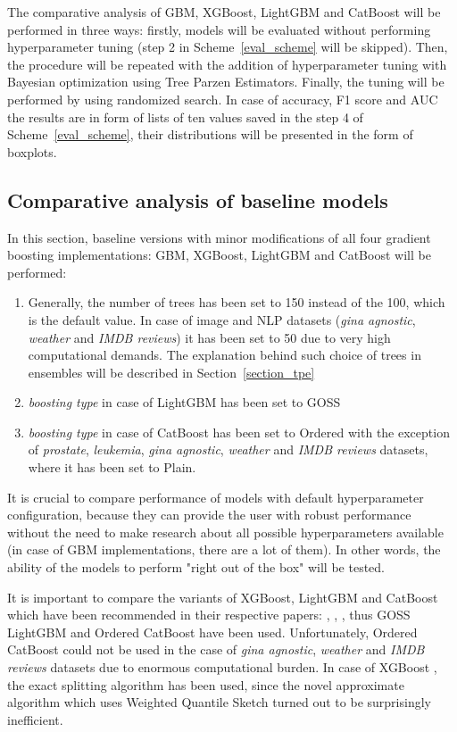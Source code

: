 \documentclass[magisterska, english]{pwr_wmat_praca_dyplomowa}
\theoremstyle{plain}
\numberwithin{theorem}{chapter}
\theoremstyle{definition}
\numberwithin{theorem}{chapter}
\begin{document}
The comparative analysis of GBM, XGBoost, LightGBM and CatBoost will be performed in three ways: firstly, models will be evaluated without performing hyperparameter tuning (step 2 in Scheme~\ref{eval_scheme} will be skipped). Then, the procedure will be repeated with the addition of hyperparameter tuning with Bayesian optimization using Tree Parzen Estimators. Finally, the tuning will be performed by using randomized search. In case of accuracy, F1 score and AUC the results are in form of lists of ten values saved in the step 4 of Scheme~\ref{eval_scheme}, their distributions will be presented in the form of boxplots.

\subsection{Comparative analysis of baseline models}\label{section:baseline}
In this section, baseline versions with minor modifications of all four gradient boosting implementations: GBM, XGBoost, LightGBM and CatBoost will be performed:
\begin{enumerate}
    \item Generally, the number of trees has been set to 150 instead of the 100, which is the default value. In case of image and NLP datasets (\emph{gina agnostic}, \emph{weather} and \emph{IMDB reviews}) it has been set to 50 due to very high computational demands. The explanation behind such choice of trees in ensembles will be described in Section~\ref{section_tpe}
    \item \emph{boosting type} in case of LightGBM has been set to GOSS
    \item \emph{boosting type} in case of CatBoost has been set to Ordered with the exception of \emph{prostate}, \emph{leukemia}, \emph{gina agnostic}, \emph{weather} and \emph{IMDB reviews} datasets, where it has been set to Plain.
\end{enumerate}

It is crucial to compare performance of models with default hyperparameter configuration, because they can provide the user with robust performance without the need to make research about all possible hyperparameters available (in case of GBM implementations, there are a lot of them). In other words, the ability of the models to perform "right out of the box" will be tested.

It is important to compare the variants of XGBoost, LightGBM and CatBoost which have been recommended in their respective papers: \cite{xgboost}, \cite{lightgbm}, \cite{catboost}, thus GOSS LightGBM and Ordered CatBoost have been used. Unfortunately, Ordered CatBoost could not be used in the case of \emph{gina agnostic}, \emph{weather} and \emph{IMDB reviews} datasets due to enormous computational burden. In case of XGBoost \cite{xgboost}, the exact splitting algorithm has been used, since the novel approximate algorithm which uses Weighted Quantile Sketch turned out to be surprisingly inefficient.
\end{document}
